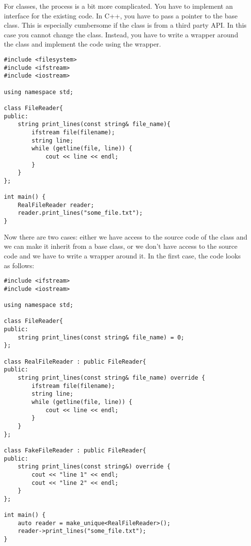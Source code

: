 For classes, the process is a bit more complicated. You have to implement an interface for the existing code. In C++, you have to pass a pointer to the base class. This is especially cumbersome if the class is from a third party API. In this case you cannot change the class. Instead, you have to write a wrapper around the class and implement the code using the wrapper.

\begin{programcode}{}
\begin{verbatim}
#include <filesystem>
#include <ifstream>
#include <iostream>

using namespace std; 

class FileReader{
public:
    string print_lines(const string& file_name){
        ifstream file(filename);
        string line;
        while (getline(file, line)) {
            cout << line << endl;
        }
    }
};

int main() {
    RealFileReader reader;
    reader.print_lines("some_file.txt");
}
\end{verbatim}
\end{programcode}

Now there are two cases: either we have access to the source code of the  class and we can make it inherit from a base class, or we don't have access to the source code and we have to write a wrapper around it. In the first case, the code looks as follows:


\begin{programcode}{}
\begin{verbatim}
#include <ifstream>
#include <iostream>

using namespace std; 

class FileReader{
public:
    string print_lines(const string& file_name) = 0;
};

class RealFileReader : public FileReader{
public:
    string print_lines(const string& file_name) override {
        ifstream file(filename);
        string line;
        while (getline(file, line)) {
            cout << line << endl;
        }
    }
};

class FakeFileReader : public FileReader{
public:
    string print_lines(const string&) override {
        cout << "line 1" << endl;
        cout << "line 2" << endl;
    }
};

int main() {
    auto reader = make_unique<RealFileReader>();
    reader->print_lines("some_file.txt");
}
\end{verbatim}
\end{programcode}

